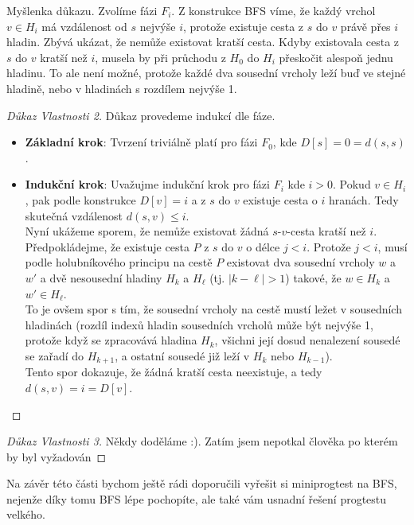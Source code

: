 \noindent Myšlenka důkazu. Zvolíme fázi $F_i$. Z konstrukce BFS víme, že každý vrchol $v \in H_i$ má vzdálenost od $s$ nejvýše $i$, protože existuje cesta z $s$ do $v$ právě přes $i$ hladin. Zbývá ukázat, že nemůže existovat kratší cesta. Kdyby existovala cesta z $s$ do $v$ kratší než $i$, musela by při průchodu z $H_0$ do $H_i$ přeskočit alespoň jednu hladinu. To ale není možné, protože každé dva sousední vrcholy leží buď ve stejné hladině, nebo v hladinách s rozdílem nejvýše 1.

\bigskip

\begin{proof}[Důkaz Vlastnosti 2]
Důkaz provedeme indukcí dle fáze.
\begin{itemize}
\item \textbf{Základní krok}: Tvrzení triviálně platí pro fázi $F_0$, kde       $D[s] = 0 = d(s, s)$.
\item \textbf{Indukční krok}: Uvažujme indukční krok pro fázi $F_i$ kde $i >     0$. Pokud $v \in H_i$, pak podle konstrukce $D[v] = i$ a z $s$ do $v$        existuje cesta o $i$ hranách. Tedy skutečná vzdálenost $d(s, v) \le i$.\\
    Nyní ukážeme sporem, že nemůže existovat žádná $s$-$v$-cesta kratší než $i$. Předpokládejme, že existuje cesta $P$ z $s$ do $v$ o délce $j < i$. Protože $j < i$, musí podle holubníkového principu na cestě $P$ existovat dva sousední vrcholy $w$ a $w'$ a dvě nesousední hladiny $H_k$ a $H_\ell$ (tj. $|k - \ell| > 1$) takové, že $w \in H_k$ a $w' \in H_\ell$. \\
    To je ovšem spor s tím, že sousední vrcholy na cestě mustí ležet v sousedních hladinách (rozdíl indexů hladin sousedních vrcholů může být nejvýše 1, protože když se zpracovává hladina $H_k$, všichni její dosud nenalezení sousedé se zařadí do $H_{k+1}$, a ostatní sousedé již leží v $H_k$ nebo $H_{k-1}$). \\
    Tento spor dokazuje, že žádná kratší cesta neexistuje, a tedy $d(s, v) = i = D[v]$.
\end{itemize}
\end{proof}

\bigskip

\begin{proof}[Důkaz Vlastnosti 3]
\leavevmode
    Někdy doděláme :). Zatím jsem nepotkal člověka po kterém by byl vyžadován
\end{proof}

\medskip

\noindent Na závěr této části bychom ještě rádi doporučili vyřešit si miniprogtest na BFS, nejenže díky tomu BFS lépe pochopíte, ale také vám usnadní řešení progtestu velkého.

